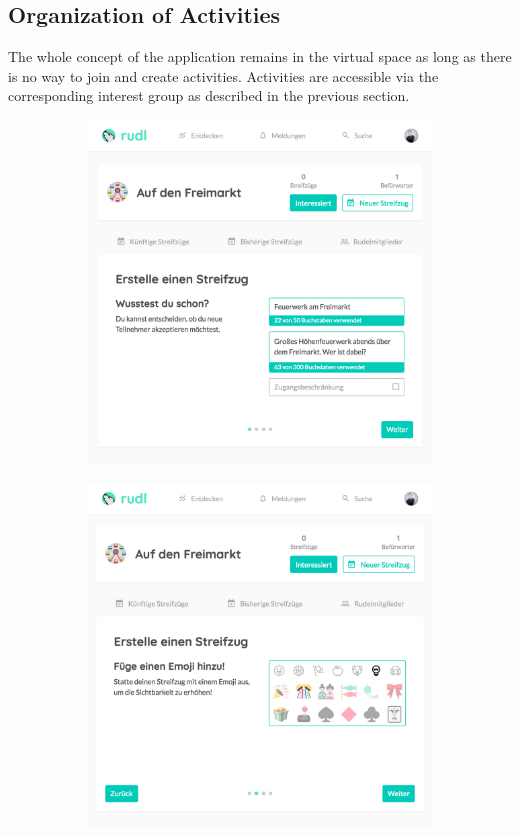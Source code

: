 \documentclass[12pt,numbers=noenddot,parskip,bibliography=totocnumbered,listof=totocnumbered,draft]{scrreprt}
\begin{document}
\subsection{Organization of Activities}
The whole concept of the application remains in the virtual space as long as there is no way to join and create activities. Activities are accessible via the corresponding interest group as described in the previous section. 

\begin{figure}
\begin{subfigure}[t]{0.45\textwidth}%
\centering
\includegraphics[width=\linewidth]{createactivity0.png}
\caption{}
\label{createactivity0}
\end{subfigure}%
\hfill
\begin{subfigure}[t]{0.45\textwidth}%
\centering
\includegraphics[width=\linewidth]{createactivity1.png}

\end{subfigure}
\end{figure}
\end{document}
